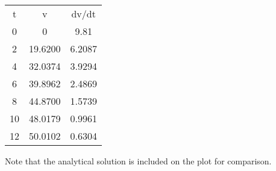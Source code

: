 \documentclass[../main.tex]{subfiles}
\begin{document}
\begin{enumerate}[label=\bfseries(\alph*)]
\begin{tabular}{ccc}
	t&v&dv/dt\\
	0 & 0 & 9.81\\
	2 & 19.6200 & 6.2087\\
	4 & 32.0374 & 3.9294 \\
	 6 & 39.8962 & 2.4869\\
	8 & 44.8700 & 1.5739\\
	10 & 48.0179 & 0.9961\\
	12 & 50.0102 & 0.6304\\
	\end{tabular}
	\bigbreak
\begin{figure}[H]
		\hspace*{1cm}
		\label{fig:fig_1_2}
	\end{figure}
	\bigbreak
Note that the analytical solution is included on the plot for comparison.
\bigbreak
\end{enumerate}
\end{document}
